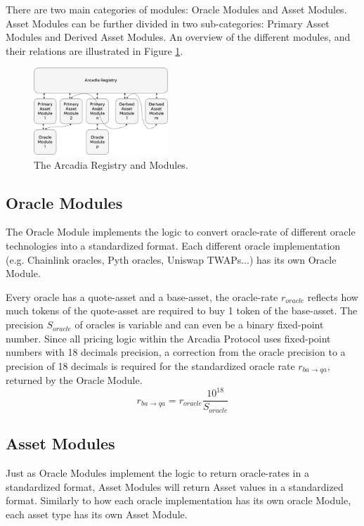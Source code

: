 \documentclass[sigconf,nonacm]{acmart}
\begin{document}
There are two main categories of modules: Oracle Modules and Asset Modules.
Asset Modules can be further divided in two sub-categories: Primary Asset Modules and Derived Asset Modules.
An overview of the different modules, and their relations are illustrated in Figure \ref{fig:arcadia-registry}.

\begin{figure}
    \centering
    \includegraphics[width=0.45\textwidth]{images/Arcadia-Registry.png}
    \caption{The Arcadia Registry and Modules. \label{fig:arcadia-registry}}
\end{figure}

\subsection{Oracle Modules}
The Oracle Module implements the logic to convert oracle-rate of different oracle technologies into a standardized format.
Each different oracle implementation (e.g. Chainlink oracles, Pyth oracles, Uniswap TWAPs...) has its own Oracle Module.

Every oracle has a quote-asset and a base-asset, the oracle-rate $r_{oracle}$ reflects how much tokens of the quote-asset are required to buy 1 token of the base-asset.
The precision $S_{oracle}$ of oracles is variable and can even be a binary fixed-point number.
Since all pricing logic within the Arcadia Protocol uses fixed-point numbers with 18 decimals precision,
a correction from the oracle precision to a precision of 18 decimals is required for the standardized oracle rate $r_{ba\rightarrow qa}$, returned by the Oracle Module.
\begin{equation}
    \label{eq:oracle-module}
    r_{ba\rightarrow qa} = r_{oracle} \frac{10^{18}}{S_{oracle}}
\end{equation}

\subsection{Asset Modules}
Just as Oracle Modules implement the logic to return oracle-rates in a standardized format,
Asset Modules will return Asset values in a standardized format.
Similarly to how each oracle implementation has its own oracle Module, each asset type has its own Asset Module.
\end{document}
